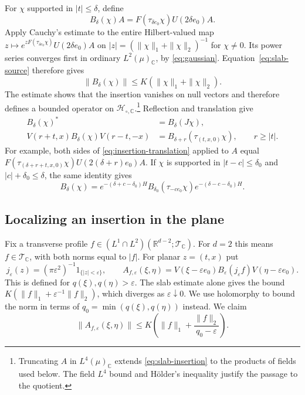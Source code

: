 \documentclass[11pt, letterpaper, reqno]{amsart}
\theoremstyle{definition}
\theoremstyle{remark}
\newcommand{\bbC}{\mathbb{C}}
\newcommand{\bbR}{\mathbb{R}}
\newcommand{\calH}{\mathcal{H}}
\newcommand{\calT}{\mathcal{T}}
\begin{document}
For $\chi$ supported in $|t|\leq\delta$, define
\begin{equation}\label{eq:slab-insertion}
 B_\delta(\chi)A=F(\tau_{\delta e_0}\chi)U(2\delta e_0)A.
\end{equation}
Apply Cauchy's estimate to the entire Hilbert-valued map
$z\mapsto e^{zF(\tau_{\delta e_0}\chi)}U(2\delta e_0)A$ on
$|z|=(\|\chi\|_1+\|\chi\|_2)^{-1}$ for $\chi\neq0$. Its power
series converges first in ordinary $L^2(\mu)_\bbC$, by
\eqref{eq:gaussian}. Equation~\eqref{eq:slab-source}
therefore gives
\begin{equation}\label{eq:insertion-bound}
 \|B_\delta(\chi)\|\leq K(\|\chi\|_1+\|\chi\|_2).
\end{equation}
The estimate shows that the insertion vanishes on null vectors and
therefore defines a bounded operator on $\calH_{\circ,\bbC}$.\footnote{Truncating $A$ in $L^4(\mu)_\bbC$ extends
\eqref{eq:slab-insertion} to the products of fields used below.
The field $L^4$ bound and H\"older's inequality justify the passage
to the quotient.}
Reflection and translation give
\begin{align}
 B_\delta(\chi)^*&=B_\delta(J\chi),\label{eq:insertion-adjoint}\\
 V(r+t,x)B_\delta(\chi)V(r-t,-x)
   &=B_{\delta+r}(\tau_{(t,x,0)}\chi),\qquad r\geq|t|.
 \label{eq:insertion-translation}
\end{align}
For example, both sides of \eqref{eq:insertion-translation} applied to
$A$ equal
$F(\tau_{(\delta+r+t,x,0)}\chi)U(2(\delta+r)e_0)A$.
If $\chi$ is supported in $|t-c|\leq\delta_0$ and
$|c|+\delta_0\leq\delta$, the same identity gives
\begin{equation}\label{eq:insertion-localization}
 B_\delta(\chi)=e^{-(\delta+c-\delta_0)H}
 B_{\delta_0}(\tau_{-ce_0}\chi)e^{-(\delta-c-\delta_0)H}.
\end{equation}

\subsection{Localizing an insertion in the plane}\label{subsec:point}

Fix a transverse profile $f\in(L^1\cap L^2)(\bbR^{d-2};\calT_\bbC)$.
For $d=2$ this means $f\in\calT_\bbC$, with both norms equal to $|f|$.
For planar $z=(t,x)$ put
\begin{equation}
 j_\varepsilon(z)=(\pi\varepsilon^2)^{-1}1_{\{|z|<\varepsilon\}},
 \qquad
 A_{f,\varepsilon}(\xi,\eta)
 =V(\xi-\varepsilon e_0)B_\varepsilon(j_\varepsilon f)
     V(\eta-\varepsilon e_0).
\end{equation}
This is defined for $q(\xi),q(\eta)>\varepsilon$. The slab estimate
alone gives the bound $K(\|f\|_1+\varepsilon^{-1}\|f\|_2)$, which diverges as
$\varepsilon\downarrow0$. We use holomorphy to bound the norm in terms
of $q_0=\min(q(\xi),q(\eta))$ instead. We claim
\begin{equation}\label{eq:regularized-point-bound}
 \|A_{f,\varepsilon}(\xi,\eta)\|
       \leq K\left(\|f\|_1+\frac{\|f\|_2}{q_0-\varepsilon}\right).
\end{equation}
\end{document}
